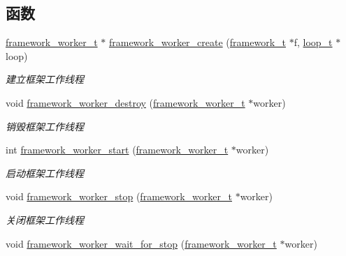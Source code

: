\subsection*{函数}
\begin{DoxyCompactItemize}
\item 
\hyperlink{a00051_aeb7a44e6b579659a8aae81f3ab819af3_aeb7a44e6b579659a8aae81f3ab819af3}{framework\+\_\+worker\+\_\+t} $\ast$ \hyperlink{a00060_a033314598ad1544a7b6cc0cf2e5930f2_a033314598ad1544a7b6cc0cf2e5930f2}{framework\+\_\+worker\+\_\+create} (\hyperlink{a00051_a6149d769f6f07ed14a40a271c95d8463_a6149d769f6f07ed14a40a271c95d8463}{framework\+\_\+t} $\ast$f, \hyperlink{a00051_a9c3ad1cd2de83e09f3a7b59fa82c94ee_a9c3ad1cd2de83e09f3a7b59fa82c94ee}{loop\+\_\+t} $\ast$loop)
\begin{DoxyCompactList}\small\item\em 建立框架工作线程 \end{DoxyCompactList}\item 
void \hyperlink{a00060_add5ddcbe427122e3afe63a10e3448116_add5ddcbe427122e3afe63a10e3448116}{framework\+\_\+worker\+\_\+destroy} (\hyperlink{a00051_aeb7a44e6b579659a8aae81f3ab819af3_aeb7a44e6b579659a8aae81f3ab819af3}{framework\+\_\+worker\+\_\+t} $\ast$worker)
\begin{DoxyCompactList}\small\item\em 销毁框架工作线程 \end{DoxyCompactList}\item 
int \hyperlink{a00060_a8791f9f6e107cd5127797cbffcd65ea8_a8791f9f6e107cd5127797cbffcd65ea8}{framework\+\_\+worker\+\_\+start} (\hyperlink{a00051_aeb7a44e6b579659a8aae81f3ab819af3_aeb7a44e6b579659a8aae81f3ab819af3}{framework\+\_\+worker\+\_\+t} $\ast$worker)
\begin{DoxyCompactList}\small\item\em 启动框架工作线程 \end{DoxyCompactList}\item 
void \hyperlink{a00060_a22e4e55cc90068dc691d1b4de736fd6e_a22e4e55cc90068dc691d1b4de736fd6e}{framework\+\_\+worker\+\_\+stop} (\hyperlink{a00051_aeb7a44e6b579659a8aae81f3ab819af3_aeb7a44e6b579659a8aae81f3ab819af3}{framework\+\_\+worker\+\_\+t} $\ast$worker)
\begin{DoxyCompactList}\small\item\em 关闭框架工作线程 \end{DoxyCompactList}\item 
void \hyperlink{a00060_a11365f74b7c96c86c8c61d2b1f368b9c_a11365f74b7c96c86c8c61d2b1f368b9c}{framework\+\_\+worker\+\_\+wait\+\_\+for\+\_\+stop} (\hyperlink{a00051_aeb7a44e6b579659a8aae81f3ab819af3_aeb7a44e6b579659a8aae81f3ab819af3}{framework\+\_\+worker\+\_\+t} $\ast$worker)

\end{DoxyCompactItemize}
